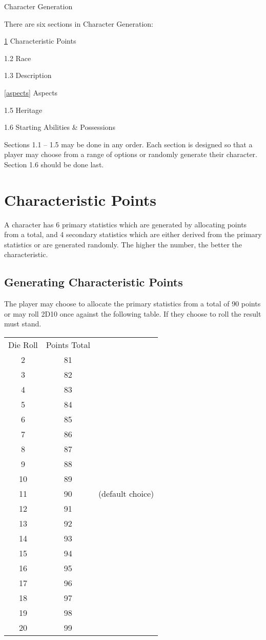 \begin{Chapter}{Character Generation}

There are six sections in Character Generation: 
\begin{Itemize}
\item \ref{characteristic points} Characteristic Points 
\item 1.2 Race 
\item 1.3 Description 
\item \ref{aspects}  Aspects
\item 1.5 Heritage 
\item 1.6 Starting Abilities \& Possessions 
\end{Itemize}

Sections 1.1 – 1.5 may be done in any order. Each section is designed
so that a player may choose from a range of options or randomly
generate their character. Section 1.6 should be done last.

\section{Characteristic Points}
\label{characteristic points}
A character has 6 primary statistics which are generated by allocating
points from a total, and 4 secondary statistics which are either
derived from the primary statistics or are generated randomly.  The
higher the number, the better the characteristic.

\subsection{Generating Characteristic Points}

The player may choose to allocate the primary statistics from a total
of 90 points or may roll 2D10 once against the following table.  If
they choose to roll the result must stand.

\begin{tabular}{ccl}
Die Roll  & Points Total \\

2	& 81 \\
3	& 82 \\ 
4	& 83 \\
5	& 84 \\
6	& 85 \\
7	& 86 \\
8	& 87 \\
9	& 88 \\
10	& 89 \\
11	& 90 & (default choice) \\
12	& 91 \\
13	& 92 \\
14	& 93 \\
15	& 94 \\
16	& 95 \\
17	& 96 \\
18	& 97 \\
19	& 98 \\
20	& 99 \\
\end{tabular}


\end{Chapter}
